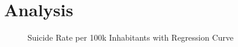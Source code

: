 \section{Analysis}

\begin{figure}
    \centering
    \caption{Suicide Rate per 100k Inhabitants with Regression Curve}
    \label{fig:regression-curve}
\end{figure}
